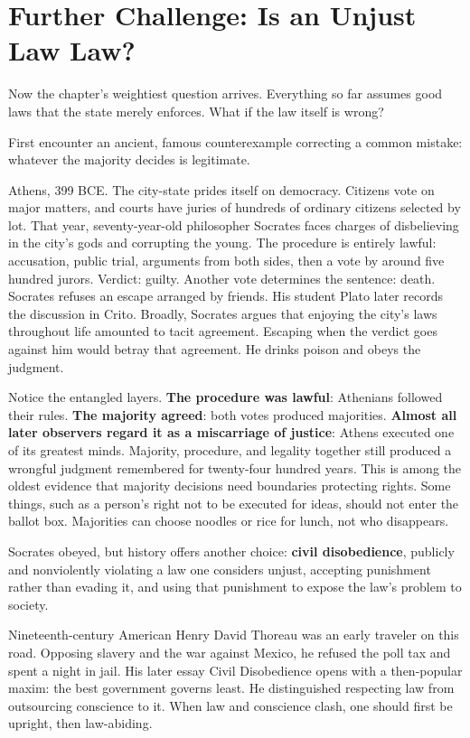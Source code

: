 \section{Further Challenge: Is an Unjust Law Law?}
Now the chapter's weightiest question arrives. Everything so far assumes good laws that the state merely enforces. What if the law itself is wrong?

First encounter an ancient, famous counterexample correcting a common mistake: whatever the majority decides is legitimate.

Athens, 399 BCE. The city-state prides itself on democracy. Citizens vote on major matters, and courts have juries of hundreds of ordinary citizens selected by lot. That year, seventy-year-old philosopher Socrates faces charges of disbelieving in the city's gods and corrupting the young. The procedure is entirely lawful: accusation, public trial, arguments from both sides, then a vote by around five hundred jurors. Verdict: guilty. Another vote determines the sentence: death. Socrates refuses an escape arranged by friends. His student Plato later records the discussion in Crito. Broadly, Socrates argues that enjoying the city's laws throughout life amounted to tacit agreement. Escaping when the verdict goes against him would betray that agreement. He drinks poison and obeys the judgment.

Notice the entangled layers. \textbf{The procedure was lawful}: Athenians followed their rules. \textbf{The majority agreed}: both votes produced majorities. \textbf{Almost all later observers regard it as a miscarriage of justice}: Athens executed one of its greatest minds. Majority, procedure, and legality together still produced a wrongful judgment remembered for twenty-four hundred years. This is among the oldest evidence that majority decisions need boundaries protecting rights. Some things, such as a person's right not to be executed for ideas, should not enter the ballot box. Majorities can choose noodles or rice for lunch, not who disappears.

Socrates obeyed, but history offers another choice: \textbf{civil disobedience}, publicly and nonviolently violating a law one considers unjust, accepting punishment rather than evading it, and using that punishment to expose the law's problem to society.

Nineteenth-century American Henry David Thoreau was an early traveler on this road. Opposing slavery and the war against Mexico, he refused the poll tax and spent a night in jail. His later essay Civil Disobedience opens with a then-popular maxim: the best government governs least. He distinguished respecting law from outsourcing conscience to it. When law and conscience clash, one should first be upright, then law-abiding.

